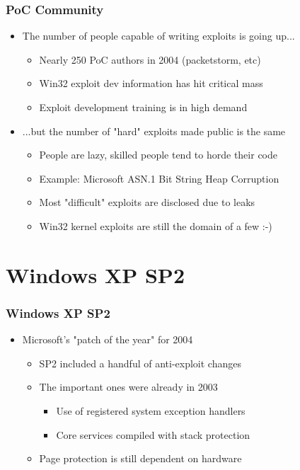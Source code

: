 \documentclass{beamer}
\newenvironment{sitemize}{\vspace{1mm}\begin{itemize}\itemsep 4pt\small}{\end{itemize}}
\begin{document}
\begin{frame}[t]
  \frametitle{PoC Community}
	
	\begin{sitemize}
		\item The number of people capable of writing exploits is going up...
		\begin{sitemize}
			\item Nearly 250 PoC authors in 2004 (packetstorm, etc)
			\item Win32 exploit dev information has hit critical mass
			\item Exploit development training is in high demand
		\end{sitemize}	
	\end{sitemize}
	
	\pause
	\begin{sitemize}
		\item ...but the number of "hard" exploits made public is the same
		\begin{sitemize}
			\item People are lazy, skilled people tend to horde their code
			\item Example: Microsoft ASN.1 Bit String Heap Corruption
			\item Most "difficult" exploits are disclosed due to leaks
			\item Win32 kernel exploits are still the domain of a few :-)
		\end{sitemize}
	\end{sitemize}
\end{frame}

\section{Windows XP SP2}
\begin{frame}[t]
  \frametitle{Windows XP SP2}
	\begin{sitemize}
		\item Microsoft's "patch of the year" for 2004
		\begin{sitemize}
			\item SP2 included a handful of anti-exploit changes
			\item The important ones were already in 2003
			\begin{sitemize}
				\item Use of registered system exception handlers
				\item Core services compiled with stack protection
			\end{sitemize}
			\item Page protection is still dependent on hardware
		\end{sitemize}	
	\end{sitemize}
\end{frame}
\end{document}
